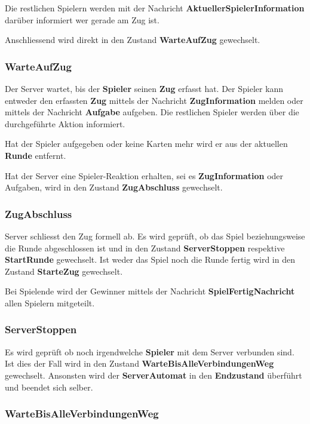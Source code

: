 \documentclass[12pt,halfparskip]{scrartcl}
\begin{document}
Die restlichen Spielern werden mit der Nachricht \textbf{AktuellerSpielerInformation} darüber informiert wer gerade am Zug ist.

Anschliessend wird direkt in den Zustand \textbf{WarteAufZug} gewechselt.

\subsubsection{WarteAufZug}
\label{ssub:warteaufzug}
Der Server wartet, bis der \textbf{Spieler} seinen \textbf{Zug} erfasst hat. Der Spieler kann entweder den erfassten \textbf{Zug} mittels der Nachricht \textbf{ZugInformation} melden oder mittels der Nachricht \textbf{Aufgabe} aufgeben. Die restlichen Spieler werden über die durchgeführte Aktion informiert.

Hat der Spieler aufgegeben oder keine Karten mehr wird er aus der aktuellen \textbf{Runde} entfernt.

Hat der Server eine Spieler-Reaktion erhalten, sei es \textbf{ZugInformation} oder Aufgaben, wird in den Zustand \textbf{ZugAbschluss} gewechselt.

\subsubsection{ZugAbschluss}
\label{ssub:zugabschluss}
Server schliesst den Zug formell ab. Es wird geprüft, ob das Spiel beziehungsweise die Runde abgeschlossen ist und in den Zustand \textbf{ServerStoppen} respektive \textbf{StartRunde} gewechselt. Ist weder das Spiel noch die Runde fertig wird in den Zustand \textbf{StarteZug} gewechselt.

Bei Spielende wird der Gewinner mittels der Nachricht \textbf{SpielFertigNachricht} allen Spielern mitgeteilt.
	
\subsubsection{ServerStoppen}
Es wird geprüft ob noch irgendwelche \textbf{Spieler} mit dem Server verbunden sind. Ist dies der Fall wird in den Zustand \textbf{WarteBisAlleVerbindungenWeg} gewechselt. Ansonsten wird der \textbf{ServerAutomat} in den \textbf{Endzustand} überführt und beendet sich selber.

\subsubsection{WarteBisAlleVerbindungenWeg}
\end{document}

